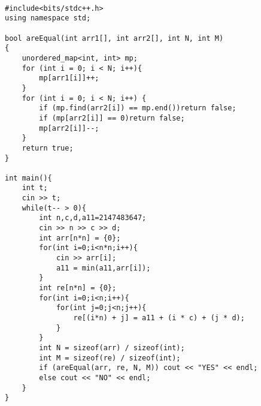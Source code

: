 \documentclass{article}
\begin{document}
\begin{lstlisting}

#include<bits/stdc++.h>
using namespace std;

bool areEqual(int arr1[], int arr2[], int N, int M)
{
    unordered_map<int, int> mp;
    for (int i = 0; i < N; i++){
        mp[arr1[i]]++;
    }
    for (int i = 0; i < N; i++) {
        if (mp.find(arr2[i]) == mp.end())return false;
        if (mp[arr2[i]] == 0)return false;
        mp[arr2[i]]--;
    }
    return true;
}

int main(){
    int t;
    cin >> t;
    while(t-- > 0){
        int n,c,d,a11=2147483647;
        cin >> n >> c >> d;
        int arr[n*n] = {0};
        for(int i=0;i<n*n;i++){
            cin >> arr[i];
            a11 = min(a11,arr[i]);
        }
        int re[n*n] = {0};
        for(int i=0;i<n;i++){
            for(int j=0;j<n;j++){
                re[(i*n) + j] = a11 + (i * c) + (j * d);
            }
        }
        int N = sizeof(arr) / sizeof(int);
        int M = sizeof(re) / sizeof(int);
        if (areEqual(arr, re, N, M)) cout << "YES" << endl;
        else cout << "NO" << endl;
    }
}

\end{lstlisting}
\end{document}
